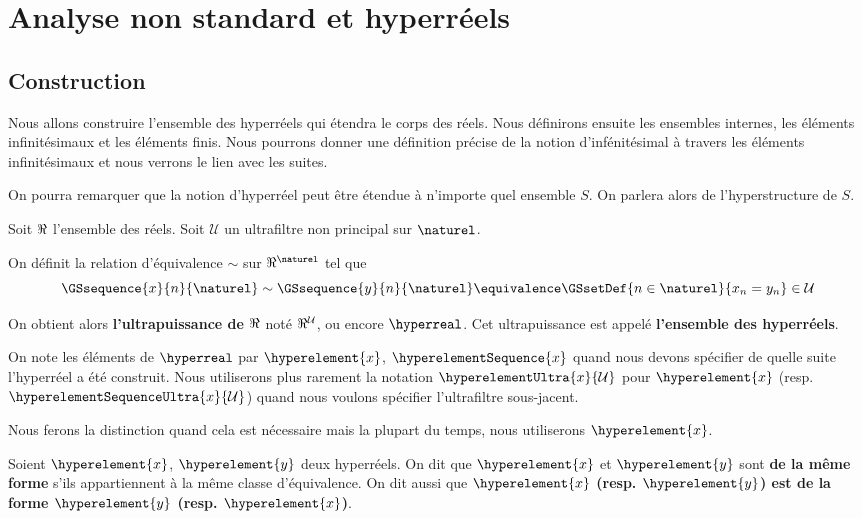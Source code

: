 \chapter{Analyse non standard et hyperréels}

\label{chapter_hyperreal}

\section{Construction}

Nous allons construire l'ensemble des hyperréels qui étendra le corps des réels.
Nous définirons ensuite les ensembles internes, les éléments infinitésimaux et
les éléments finis. Nous pourrons donner une définition précise de la notion
d'infénitésimal à travers les éléments infinitésimaux et nous verrons le lien
avec les suites.

On pourra remarquer que la notion d'hyperréel peut être étendue à n'importe quel
ensemble $S$. On parlera alors de l'hyperstructure de $S$.

Soit $\real$ l'ensemble des réels. Soit $\mathcal{U}$ un ultrafiltre non
principal sur $\naturel$.

On définit la relation d'équivalence $\sim$ sur $\real^{\naturel}$ tel que
\begin{equation}
	\GSsequence{x}{n}{\naturel} \sim \GSsequence{y}{n}{\naturel} \equivalence \GSsetDef{n \in \naturel}{x_{n} = y_{n}} \in \mathcal{U}
\end{equation}

On obtient alors \textbf{l'ultrapuissance de $\real$} noté $\real^{\mathcal{U}}$,
ou encore $\hyperreal$. Cet ultrapuissance est appelé \textbf{l'ensemble des
hyperréels}.

On note les éléments de $\hyperreal$ par $\hyperelement{x}$,
$\hyperelementSequence{x}$ quand nous devons spécifier de quelle suite
l'hyperréel a été construit. Nous utiliserons plus rarement la notation
$\hyperelementUltra{x}{\mathcal{U}}$ pour $\hyperelement{x}$ (resp.
$\hyperelementSequenceUltra{x}{\mathcal{U}}$) quand nous voulons spécifier l'ultrafiltre
sous-jacent.

Nous ferons la distinction quand cela est nécessaire mais la plupart du temps,
nous utiliserons $\hyperelement{x}$.

\begin{definition} 
	Soient $\hyperelement{x}$, $\hyperelement{y}$ deux hyperréels. On dit que
	$\hyperelement{x}$ et $\hyperelement{y}$ sont \textbf{de la même forme}
	s'ils appartiennent à la même classe d'équivalence. On dit aussi que
	\textbf{$\hyperelement{x}$ (resp. $\hyperelement{y}$) est de la forme
	$\hyperelement{y}$ (resp. $\hyperelement{x}$)}.
\end{definition}

